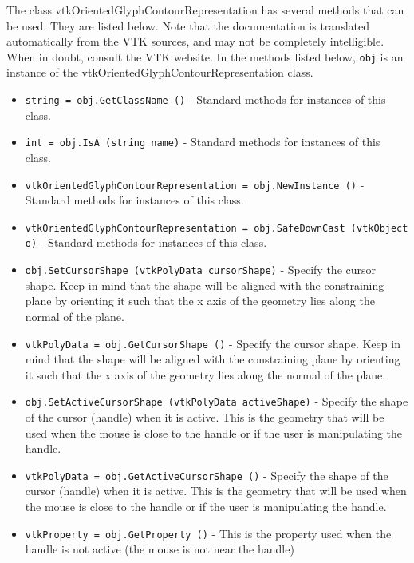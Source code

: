 The class vtkOrientedGlyphContourRepresentation has several methods that can be used.
  They are listed below.
Note that the documentation is translated automatically from the VTK sources,
and may not be completely intelligible.  When in doubt, consult the VTK website.
In the methods listed below, \verb|obj| is an instance of the vtkOrientedGlyphContourRepresentation class.
\begin{itemize}
\item  \verb|string = obj.GetClassName ()| -  Standard methods for instances of this class.

\item  \verb|int = obj.IsA (string name)| -  Standard methods for instances of this class.

\item  \verb|vtkOrientedGlyphContourRepresentation = obj.NewInstance ()| -  Standard methods for instances of this class.

\item  \verb|vtkOrientedGlyphContourRepresentation = obj.SafeDownCast (vtkObject o)| -  Standard methods for instances of this class.

\item  \verb|obj.SetCursorShape (vtkPolyData cursorShape)| -  Specify the cursor shape. Keep in mind that the shape will be
 aligned with the  constraining plane by orienting it such that
 the x axis of the geometry lies along the normal of the plane.

\item  \verb|vtkPolyData = obj.GetCursorShape ()| -  Specify the cursor shape. Keep in mind that the shape will be
 aligned with the  constraining plane by orienting it such that
 the x axis of the geometry lies along the normal of the plane.

\item  \verb|obj.SetActiveCursorShape (vtkPolyData activeShape)| -  Specify the shape of the cursor (handle) when it is active.
 This is the geometry that will be used when the mouse is
 close to the handle or if the user is manipulating the handle.

\item  \verb|vtkPolyData = obj.GetActiveCursorShape ()| -  Specify the shape of the cursor (handle) when it is active.
 This is the geometry that will be used when the mouse is
 close to the handle or if the user is manipulating the handle.

\item  \verb|vtkProperty = obj.GetProperty ()| -  This is the property used when the handle is not active 
 (the mouse is not near the handle)


\end{itemize}
